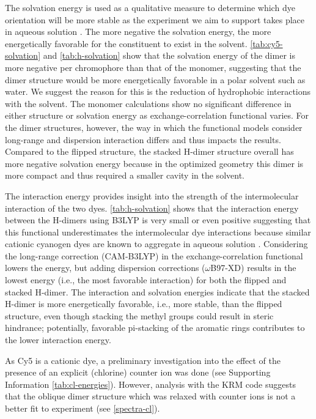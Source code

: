 The solvation energy is used as a qualitative measure to determine which dye orientation will be more stable as the experiment we aim to support takes place in aqueous solution \cite{Cannon2017}. The more negative the solvation energy, the more energetically favorable for the constituent to exist in the solvent. \autoref{tab:cy5-solvation} and \autoref{tab:h-solvation} show that the solvation energy of the dimer is more negative per chromophore than that of the monomer, suggesting that the dimer structure would be more energetically favorable in a polar solvent such as water. We suggest the reason for this is the reduction of hydrophobic interactions with the solvent. The monomer calculations show no significant difference in either structure or solvation energy as exchange-correlation functional varies. For the dimer structures, however, the way in which the functional models consider long-range and dispersion interaction differs and thus impacts the results. Compared to the flipped structure, the stacked H-dimer structure overall has more negative solvation energy because in the optimized geometry this dimer is more compact and thus required a smaller cavity in the solvent. 

The interaction energy provides insight into the strength of the intermolecular interaction of the two dyes. \autoref{tab:h-solvation} shows that the interaction energy between the H-dimers using B3LYP is very small or even positive suggesting that this functional underestimates the intermolecular dye interactions because similar cationic cyanogen dyes are known to aggregate in aqueous solution \cite{Herz1974, VonBerlepsch2000a, Friedl2016a}. Considering the long-range correction (CAM-B3LYP) in the exchange-correlation functional lowers the energy, but adding dispersion corrections ($\omega$B97-XD) results in the lowest energy (i.e., the most favorable interaction) for both the flipped and stacked H-dimer. The interaction and solvation energies indicate that the stacked H-dimer is more energetically favorable, i.e., more stable, than the flipped structure, even though stacking the methyl groups could result in steric hindrance; potentially, favorable pi-stacking of the aromatic rings contributes to the lower interaction energy. 

As Cy5 is a cationic dye, a preliminary investigation into the effect of the presence of an explicit (chlorine) counter ion was done (see Supporting Information \autoref{tab:cl-energies}). However, analysis with the KRM code suggests that the oblique dimer structure which was relaxed with counter ions is not a better fit to experiment (see \autoref{spectra-cl}).

